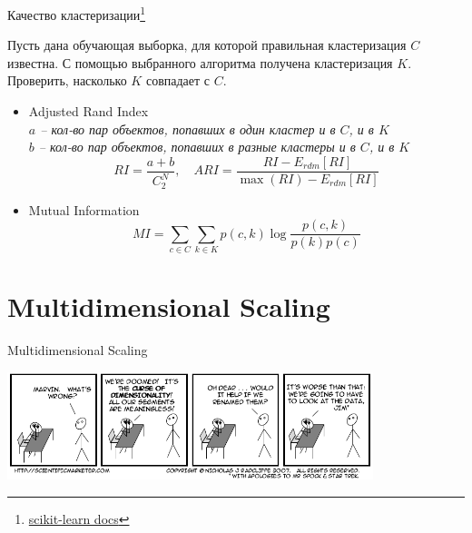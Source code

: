 \documentclass[aspectratio=169]{beamer}
\begin{document}
\begin{frame}{Качество кластеризации\footnote{\href{http://scikit-learn.org/stable/modules/clustering.html\#clustering-evaluation}{scikit-learn docs}}}

Пусть дана обучающая выборка, для которой правильная кластеризация $C$ известна. С помощью выбранного алгоритма получена кластеризация $K$. Проверить, насколько $K$ совпадает с $C$.

\vspace{1em}
\begin{itemize}
\item Adjusted Rand Index \\
{\it \small
$a$ -- кол-во пар объектов, попавших в один кластер и в $C$, и в $K$ \\
$b$ -- кол-во пар объектов, попавших в разные кластеры и в $C$, и в $K$
\[
RI = \frac{a+b}{C^N_2}, \quad ARI = \frac{RI - E_{rdm}[RI]}{\max(RI) - E_{rdm}[RI]}
\]
}
\item Mutual Information \\
{\it \small
\[
MI = \sum_{c \in C} \sum_{k \in K} p(c, k) \log \frac{p(c, k)}{p(k)p(c)}
\]
}
\end{itemize}

\end{frame}


\section{Multidimensional Scaling}


\begin{frame}

\begin{center}
{\Large Multidimensional Scaling}

\vspace{1em}
\includegraphics[width=0.8\textwidth]{images/curse.png}
\end{center}

\end{frame}
\end{document}
